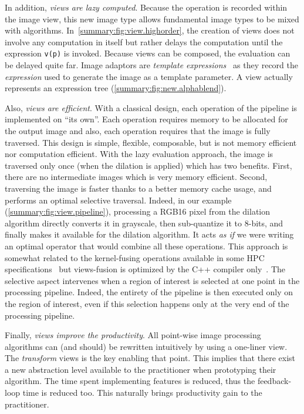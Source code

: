 In addition, \emph{views are lazy computed}. Because the operation is recorded within the image view, this new image
type allows fundamental image types to be mixed with algorithms. In~\cref{summary:fig:view.highorder}, the creation of
views does not involve any computation in itself but rather delays the computation until the expression \texttt{v(p)} is
invoked. Because views can be composed, the evaluation can be delayed quite far. Image adaptors are \emph{template
  expressions}~\parencite{veldhuizen.1995.expression,veldhuizen.2000.blitz} as they record the \emph{expression} used to
generate the image as a template parameter. A view actually represents an expression tree
(\cref{summary:fig:new.alphablend}).

Also, \emph{views are efficient}. With a classical design, each operation of the pipeline is implemented on ``its own''.
Each operation requires memory to be allocated for the output image and also, each operation requires that the image is
fully traversed. This design is simple, flexible, composable, but is not memory efficient nor computation efficient.
With the lazy evaluation approach, the image is traversed only once (when the dilation is applied) which has two
benefits. First, there are no intermediate images which is very memory efficient. Second, traversing the image is faster
thanks to a better memory cache usage, and performs an optimal selective traversal. Indeed, in our example
(\cref{summary:fig:view.pipeline}), processing a RGB16 pixel from the dilation algorithm directly converts it in
grayscale, then sub-quantize it to 8-bits, and finally makes it available for the dilation algorithm. It acts \emph{as
  if} we were writing an optimal operator that would combine all these operations. This approach is somewhat related to
the kernel-fusing operations available in some HPC specifications~\parencite{openvx.2019} but views-fusion is optimized
by the C++ compiler only~\parencite{brown.2018.ranges}. The selective aspect intervenes when a region of interest is
selected at one point in the processing pipeline. Indeed, the entirety of the pipeline is then executed only on the
region of interest, even if this selection happens only at the very end of the processing pipeline.

Finally, \emph{views improve the productivity}. All point-wise image processing algorithms can (and should) be rewritten
intuitively by using a one-liner view. The \emph{transform} views is the key enabling that point. This implies that
there exist a new abstraction level available to the practitioner when prototyping their algorithm. The time spent
implementing features is reduced, thus the feedback-loop time is reduced too. This naturally brings productivity gain to
the practitioner.


